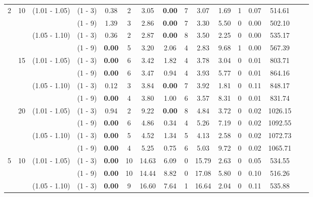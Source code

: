 \documentclass[a4paper,11pt]{article}
\begin{document}
\begin{table}[ht]
\begin{tabular}{cccccccccccccccc}
2& 	10 & (1.01 - 1.05) & (1 - 3)   &  0.38  		& 2 & 		3.05      & \textbf{0.00} 	&  7    &  3.07      &  1.69  &		1 &  0.07      &  514.61 \\
 &  &  & 				 (1 - 9)  &   1.39  		& 3 &		2.86      &  \textbf{0.00}  &  7	&  3.30      &  5.50  &	0	&  0.00      &  502.10  \\
 &  & 	 (1.05 - 1.10) & (1 - 3)  &   0.36  		& 2 &		2.87      &  \textbf{0.00}  &  8	&  3.50      &  2.25  &	0	&  0.00      &  535.17  \\
 &  &  & 				 (1 - 9)  &   \textbf{0.00} & 5 &		3.20      &  2.06  		    &  4	&  2.83  	 &  9.68  &	1	&  0.00      &  567.39  \\
 & 	15 & (1.01 - 1.05) & (1 - 3)  &   \textbf{0.00} & 6 &		3.42      &  1.82  		    &  4	&  3.78  	 &  3.04  &	0	&  0.01      &  803.71  \\
 &  &  & 				 (1 - 9)  &   \textbf{0.00} & 6 &		3.47      &  0.94  		    &  4	&  3.93  	 &  5.77  &	0	&  0.01      &  864.16  \\
 &  & 	 (1.05 - 1.10) & (1 - 3)  &   0.12  		& 3 &		3.84      &  \textbf{0.00}  &  7	&  3.92      &  1.81  &	0	&  0.11      &  848.17  \\
 &  &  & 				 (1 - 9)  &  \textbf{0.00}  & 4 &		3.80      &  1.00  		    &  6	&  3.57  	 &  8.31  &		0    &  0.01      &  831.74  \\
 & 	20 & (1.01 - 1.05) & (1 - 3)  &  0.94	        & 2 &		9.22      &  \textbf{0.00}  &  8	&  4.84      &  3.72 &		0     &  0.02      &  1026.15 \\
 &  &  & 				 (1 - 9)  &  \textbf{0.00} & 6 &		4.86      &  0.34  		    &  4	&  5.26      &  7.19 &		0     &  0.02      &  1092.55 \\
 &  &    (1.05 - 1.10) & (1 - 3)  &  \textbf{0.00} & 5 &		4.52      &  1.34  		    &  5	&  4.13      &  2.58 &		0     &  0.02      &  1072.73 \\
 &  &  & 				 (1 - 9)  &  \textbf{0.00} & 4 &		5.25      &  0.75  		    &  6	&  5.03      &  9.72 &		0     &  0.02      &  1065.71 \\
5& 	10 & (1.01 - 1.05) & (1 - 3)  &  \textbf{0.00}  & 10 &		14.63      &  6.09  	    &  0	&  15.79      &  2.63 &		0     &  0.05      &  534.55  \\
 &  &  & 				 (1 - 9)  &  \textbf{0.00}  & 10 &		14.44      &  8.82  	    &  0	&  17.08      &  5.80 &		0     &  0.10      &  516.26  \\
 &  & 	 (1.05 - 1.10) & (1 - 3)  &  \textbf{0.00}  & 9 &		16.60      &  7.64  	    &  1	&  16.64      &  2.04 &		0     &  0.11      &  535.88  \\

\end{tabular}
\end{table}
\end{document}
